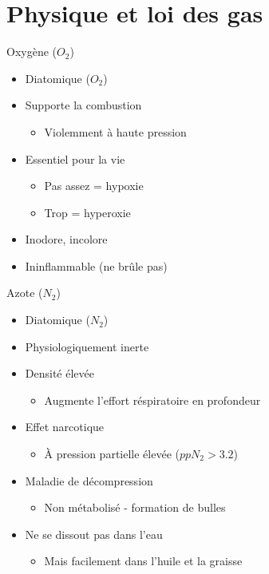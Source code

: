 
\section{Physique et loi des gas}

\begin{frame}{Oxygène ($O_2$)}
	\begin{itemize}
		\item Diatomique ($O_2$)
		\item Supporte la combustion
		\begin{itemize}
			\item Violemment à haute pression
		\end{itemize}
		\item Essentiel pour la vie
		\begin{itemize}
			\item Pas assez = hypoxie
			\item Trop = hyperoxie
		\end{itemize}
		\item Inodore, incolore
		\item Ininflammable (ne brûle pas)
	\end{itemize}
\end{frame}

\begin{frame}{Azote ($N_2$)}
	\begin{itemize}
		\item Diatomique ($N_2$)
		\item Physiologiquement inerte
		\item Densité élevée
		\begin{itemize}\item Augmente l'effort réspiratoire en profondeur\end{itemize}
		\item Effet narcotique
		\begin{itemize}\item À pression partielle élevée ($ppN_2 > 3.2$)\end{itemize}
		\item Maladie de décompression
		\begin{itemize}\item Non métabolisé - formation de bulles\end{itemize}
		\item Ne se dissout pas dans l'eau
		\begin{itemize}\item Mais facilement dans l'huile et la graisse\end{itemize}
	\end{itemize}
\end{frame}

